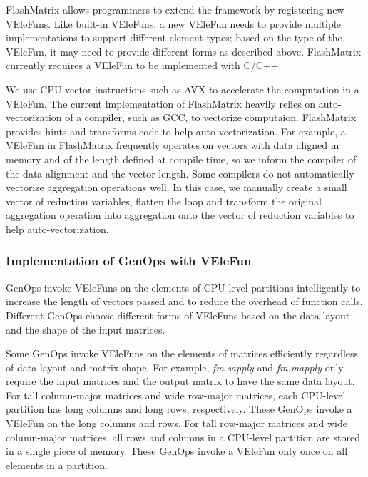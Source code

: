 FlashMatrix allows programmers to extend the framework by registering new VEleFuns.
Like built-in VEleFuns, a new VEleFun needs to provide multiple
implementations to support different element types; based on the type of
the VEleFun, it may need to provide different forms as described above.
FlashMatrix currently requires a VEleFun to be implemented with C/C++.

We use CPU vector instructions such as AVX \cite{avx} to accelerate
the computation in a VEleFun. The current implementation of FlashMatrix heavily
relies on auto-vectorization of a compiler, such as GCC, to vectorize
computaion. FlashMatrix provides hints and
transforms code to help auto-vectorization. For example, a VEleFun in FlashMatrix
frequently operates on vectors with data aligned in memory and of
the length defined at compile time, so we inform the compiler of the data alignment
and the vector length. Some compilers do not automatically vectorize
aggregation operations well. In this case, we manually create a small vector of reduction
variables, flatten the loop and transform the original aggregation operation
into aggregation onto the vector of reduction variables to help auto-vectorization.

\subsubsection{Implementation of GenOps with VEleFun}

GenOps invoke VEleFuns on the elements of CPU-level partitions intelligently
to increase the length of vectors passed and to reduce the overhead of
function calls. Different GenOps choose different
forms of VEleFuns based on the data layout and the shape of the input matrices.

Some GenOps invoke VEleFuns on the elements of matrices efficiently regardless of
data layout and matrix shape.
For example, \textit{fm.sapply} and \textit{fm.mapply} only require
the input matrices and the output matrix to have the same data layout. For tall
column-major matrices and wide row-major matrices, each CPU-level partition has
long columns and long rows, respectively. These GenOps invoke a VEleFun
on the long columns and rows. For tall row-major matrices and wide column-major
matrices, all rows and columns in a CPU-level partition are stored in a single
piece of memory. These GenOps invoke a VEleFun only once on all
elements in a partition. %

